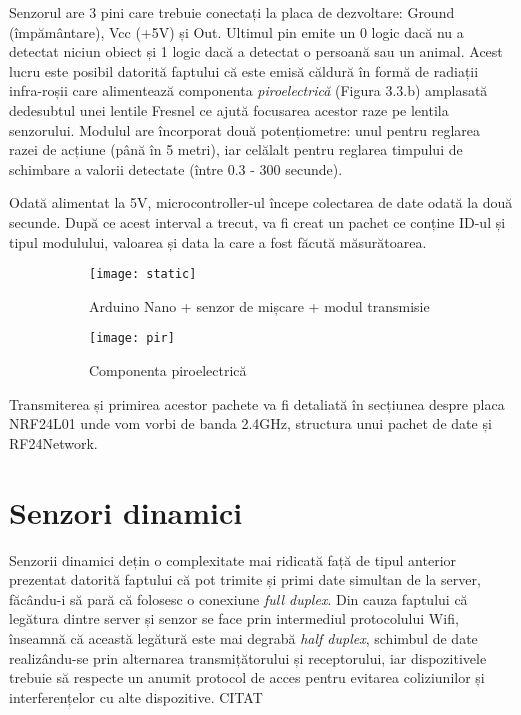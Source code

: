 Senzorul are 3 pini care trebuie conectați la placa de dezvoltare: Ground (împământare), Vcc (+5V) și Out. Ultimul pin emite un 0 logic dacă nu a detectat niciun obiect și 1 logic dacă a detectat o persoană sau un animal. Acest lucru este posibil datorită faptului că este emisă căldură în formă de radiații infra-roșii care alimentează componenta \emph{piroelectrică} (Figura 3.3.b) amplasată dedesubtul unei lentile Fresnel ce ajută focusarea acestor raze pe lentila senzorului. Modulul are încorporat două potențiometre: unul pentru reglarea razei de acțiune (până în 5 metri), iar celălalt pentru reglarea timpului de schimbare a valorii detectate (între 0.3 - 300 secunde). 

Odată alimentat la 5V, microcontroller-ul începe colectarea de date odată la două secunde. După ce acest interval a trecut, va fi creat un pachet ce conține ID-ul și tipul modulului, valoarea și data la care a fost făcută măsurătoarea. 

\begin{figure}[h]
	\centering
	\begin{subfigure}{0.85\textwidth}
		\centering
		\texttt{[image: static]}
		\caption{Arduino Nano + senzor de mișcare + modul transmisie}
		\label{fig:static}
	\end{subfigure}
	\hfill
	\begin{subfigure}{0.8\textwidth}
		\centering
		\texttt{[image: pir]}
		\caption{Componenta piroelectrică}
		\label{fig:pir}
	\end{subfigure}
	\caption{}
	\label{fig:all2}
\end{figure}
\break

Transmiterea și primirea acestor pachete va fi detaliată în secțiunea despre placa NRF24L01 unde vom vorbi de banda 2.4GHz, structura unui pachet de date și RF24Network. 

\section{Senzori dinamici}

Senzorii dinamici dețin o complexitate mai ridicată față de tipul anterior prezentat datorită faptului că pot trimite și primi date simultan de la server, făcându-i să pară că folosesc o conexiune \emph{full duplex}. Din cauza faptului că legătura dintre server și senzor se face prin intermediul protocolului Wifi, înseamnă că această legătură este mai degrabă \emph{half duplex}, schimbul de date realizându-se prin alternarea transmițătorului și receptorului, iar dispozitivele trebuie să respecte un anumit protocol de acces pentru evitarea coliziunilor și interferențelor cu alte dispozitive. CITAT

